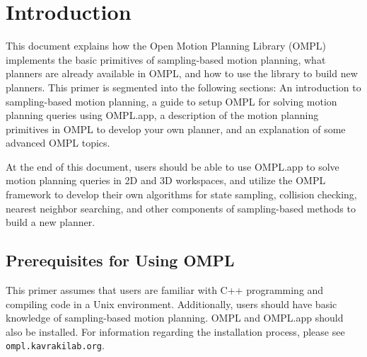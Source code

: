 \chapter{Introduction}

This document explains how the Open Motion Planning Library (OMPL) implements
the basic primitives of sampling-based motion planning, what planners are 
already available in OMPL, and how to use the library to build new planners.
This primer is segmented into the following sections: An introduction to 
sampling-based motion planning, a guide to setup OMPL for solving motion 
planning queries using OMPL.app, a description of the motion planning 
primitives in OMPL to develop your own planner, and an explanation of
some advanced OMPL topics.

At the end of this document, users should be able to use OMPL.app to solve
motion planning queries in 2D and 3D workspaces, and utilize the OMPL framework
to develop their own algorithms for state sampling, collision checking, nearest
neighbor searching, and other components of sampling-based methods to build
a new planner.


\section {Prerequisites for Using OMPL}
This primer assumes that users are familiar with C++ programming and compiling 
code in a Unix environment.  Additionally, users should have basic knowledge of
sampling-based motion planning.  OMPL and OMPL.app should also be installed.  
For information regarding the installation process, please see 
{\tt ompl.kavrakilab.org}.

